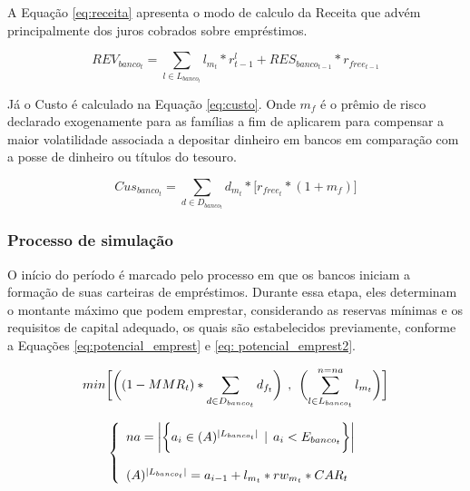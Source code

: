 \documentclass[hidelinks, article,12pt,oneside,a4paper,english,brazil,sumario=tradicional]{abntex2}
\begin{document}
A Equação \ref{eq:receita} apresenta o modo de calculo da Receita que advém principalmente dos juros cobrados sobre empréstimos. 

\begin{equation} \label{eq:receita}
REV_{banco_{t}} = \sum_{l \in L_{banco_{t}}} l_{m_{t}} * r^{l}_{t-1} + RES_{banco_{t-1}} * r_{free_{t-1}}   
\end{equation}

Já o Custo é calculado na Equação \ref{eq:custo}. Onde $m_{f}$ é o prêmio de risco declarado exogenamente para as famílias a fim de aplicarem para compensar a maior volatilidade associada a depositar dinheiro em bancos em comparação com a posse de dinheiro ou títulos do tesouro.

\begin{equation} \label{eq:custo}
Cus_{banco_{t}} = \sum_{d \in D_{banco_{t}}} d_{m_{t}} * \biggl[r_{free_{t}} * (1 + m_{f})\biggl]
\end{equation}


\subsubsection{Processo de simulação}

O início do período é marcado pelo processo em que os bancos iniciam a formação de suas carteiras de empréstimos. Durante essa etapa, eles determinam o montante máximo que podem emprestar, considerando as reservas mínimas e os requisitos de capital adequado, os quais são estabelecidos previamente, conforme a Equações \ref{eq:potencial_emprest} e \ref{eq: potencial_emprest2}.

\begin{equation} \label{eq:potencial_emprest}
min \biggl[\biggl((1- MMR_{t}) * \sum_{d \in D_{banco_{t}}} d_{f_{t}}\biggl) \hspace{1.5mm} , \hspace{1.5mm} \biggl(\sum^{n=na}_{l \in L_{banco_{t}}} l_{m_{t}}\biggl)\biggl]  
\end{equation}

\begin{equation} \label{eq: potencial_emprest2}
 \left \{ \begin{array}{lll}

na =  \biggl| \biggl\{ a_{i} \in (A)^{|L_{banco_{t}}|} \hspace{1.5mm} | \hspace{1.5mm} a_{i} < E_{banco_{t}} \biggl\} \biggl| \\
\\

(A)^{|L_{banco_{t}}|} = a_{i-1} + l_{m_{t}} * rw_{m_{t}} * CAR_{t} \hbox{}
\end{array}\right. 
\end{equation}
\end{document}
